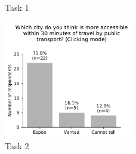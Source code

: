 \begin{appendices}
\begin{figure}[H]
\begin{subfigure}[b]{0.5\textwidth}
	\end{subfigure}%
	\caption{Task 1}
	\label{fig:task 1}
\end{figure}

\begin{figure}[H]
	\centering
	\includegraphics[width=0.5\textwidth]{visual/figures/survey/2.pdf}
	\caption{Task 2}
	\label{fig:task 2}
\end{figure}


\end{appendices}
